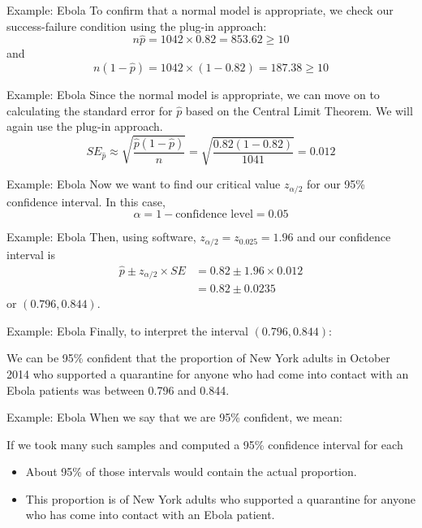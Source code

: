 \begin{frame}{Example: Ebola}
    To confirm that a normal model is appropriate, we check our success-failure condition using the plug-in approach:
    \[
        n\hat{p} = 1042\times0.82 = 853.62 \ge 10
    \]
    and 
    \[
        n(1-\hat{p}) = 1042\times(1-0.82)= 187.38 \ge 10
    \]
\end{frame}

\begin{frame}{Example: Ebola}
    Since the normal model is appropriate, we can move on to calculating the standard error for $\hat{p}$ based on the Central Limit Theorem. We will again use the plug-in approach.
    \[
        SE_{\hat{p}} \approx \sqrt{\frac{\hat{p}(1-\hat{p})}{n}} = \sqrt{\frac{0.82(1-0.82)}{1041}} = 0.012
    \]
\end{frame}

\begin{frame}{Example: Ebola}
    Now we want to find our critical value $z_{\alpha/2}$ for our 95\% confidence interval. In this case,
    \[
        \alpha = 1-\text{confidence level} = 0.05
    \]
\end{frame}

\begin{frame}{Example: Ebola}
    Then, using software, $z_{\alpha/2}=z_{0.025}=1.96$ and our confidence interval is
    \begin{align*}
        \hat{p}\pm z_{\alpha/2}\times SE &= 0.82 \pm 1.96 \times 0.012 \\
        &= 0.82 \pm 0.0235
    \end{align*}
    or $(0.796, 0.844)$.
\end{frame}

\begin{frame}{Example: Ebola}
    Finally, to interpret the interval $(0.796, 0.844)$:
    
    \vspace{12pt}We can be 95\% confident that the proportion of New York adults in October 2014 who supported a quarantine for anyone who had come into contact with an Ebola patients was between 0.796 and 0.844.
\end{frame}

\begin{frame}{Example: Ebola}
    When we say that we are 95\% confident, we mean:
    
    \vspace{12pt}If we took many such samples and computed a 95\% confidence interval for each
    \begin{itemize}
        \item About 95\% of those intervals would contain the actual proportion.
        \item This proportion is of New York adults who supported a quarantine for anyone who has come into contact with an Ebola patient.
    \end{itemize}
\end{frame}

